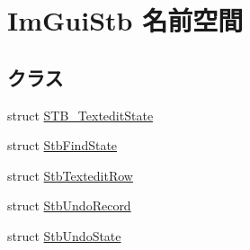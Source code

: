 \hypertarget{namespace_im_gui_stb}{}\section{Im\+Gui\+Stb 名前空間}
\label{namespace_im_gui_stb}
\subsection*{クラス}
\begin{DoxyCompactItemize}
\item 
struct \mbox{\hyperlink{struct_im_gui_stb_1_1_s_t_b___textedit_state}{S\+T\+B\+\_\+\+Textedit\+State}}
\item 
struct \mbox{\hyperlink{struct_im_gui_stb_1_1_stb_find_state}{Stb\+Find\+State}}
\item 
struct \mbox{\hyperlink{struct_im_gui_stb_1_1_stb_textedit_row}{Stb\+Textedit\+Row}}
\item 
struct \mbox{\hyperlink{struct_im_gui_stb_1_1_stb_undo_record}{Stb\+Undo\+Record}}
\item 
struct \mbox{\hyperlink{struct_im_gui_stb_1_1_stb_undo_state}{Stb\+Undo\+State}}
\end{DoxyCompactItemize}
